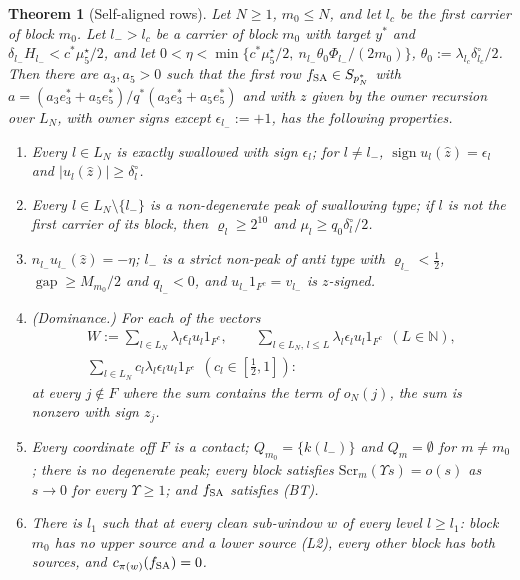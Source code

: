 \documentclass[10pt]{amsart}
\newtheorem{theorem}{Theorem}[section]
\theoremstyle{definition}
\theoremstyle{remark}
\newcommand{\sgn}{\operatorname{sign}}
\newcommand{\N}{\mathbb N}
\newcommand{\gap}{\operatorname{gap}}
\newcommand{\zh}{\hat z}
\begin{document}
\begin{theorem}[Self-aligned rows]\label{thm:II-SA}
Let $N\ge1$, $m_0\le N$, and let $l_c$ be the first carrier of block $m_0$.
Let $l_->l_c$ be a carrier of block $m_0$ with target $y^*$ and
$\delta_{l_-}H_{l_-}<c^*\mu^\star_5/2$, and let $0<\eta<\min\{c^*\mu^\star_5/2,\
n_{l_-}\theta_0\Phi_{l_-}/(2m_0)\}$, $\theta_0:=\lambda_{l_c}\delta^\circ_{l_c}/2$.
Then there are $a_3,a_5>0$ such that the first row $f_{\rm SA}\in S_{p_N^*}$
with $a=(a_3e_3^*+a_5e_5^*)/q^*(a_3e_3^*+a_5e_5^*)$ and with $z$ given by the
owner recursion over $L_N$, with owner signs except $\epsilon_{l_-}:=+1$,
has the following properties.
\begin{enumerate}
\item[(a)] Every $l\in L_N$ is exactly swallowed with sign $\epsilon_l$; for
$l\ne l_-$, $\sgn u_l(\zh)=\epsilon_l$ and $|u_l(\zh)|\ge\delta^\circ_l$.
\item[(b)] Every $l\in L_N\setminus\{l_-\}$ is a non-degenerate peak of
swallowing type; if $l$ is not the first carrier of its block, then
$\varrho_l\ge2^{10}$ and $\mu_l\ge q_0\delta^\circ_l/2$.
\item[(c)] $n_{l_-}u_{l_-}(\zh)=-\eta$; $l_-$ is a strict non-peak of anti
type with $\varrho_{l_-}<\frac12$, $\gap\ge M_{m_0}/2$ and $q_{l_-}<0$, and
$u_{l_-}1_{F^c}=v_{l_-}$ is $z$-signed.
\item[(d)] \textup{(Dominance.)}  For each of the vectors
\begin{gather*}
 W:=\sum_{l\in L_N}\lambda_l\epsilon_lu_l1_{F^c},\qquad
 \sum_{l\in L_N,\,l\le L}\lambda_l\epsilon_lu_l1_{F^c}\ \ (L\in\N),\\
 \sum_{l\in L_N}c_l\lambda_l\epsilon_lu_l1_{F^c}\ \ (c_l\in[\tfrac12,1]):
\end{gather*}
at every $j\notin F$ where the sum contains the term of $o_N(j)$, the sum is
nonzero with sign $z_j$.
\item[(e)] Every coordinate off $F$ is a contact; $Q_{m_0}=\{k(l_-)\}$ and
$Q_m=\emptyset$ for $m\ne m_0$; there is no degenerate peak; every block
satisfies $\mathrm{Scr}_m(\Upsilon s)=o(s)$ as $s\to0$ for every
$\Upsilon\ge1$; and $f_{\rm SA}$ satisfies \textup{(BT)}.
\item[(f)] There is $l_1$ such that at every clean sub-window $w$ of every
level $l\ge l_1$: block $m_0$ has no upper source and a lower source
\textup{(L2)}, every other block has both sources, and $c_{\pi(w)}(f_{\rm
SA})=0$.
\end{enumerate}
\end{theorem}
\end{document}
